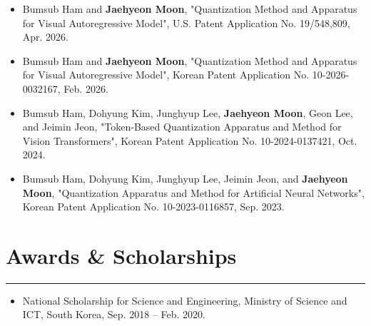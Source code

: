 \documentclass[11pt]{article}
\begin{document}
\begin{itemize}[left=0pt,itemsep=4pt,topsep=2pt]
  \item Bumsub Ham and \textbf{Jaehyeon Moon},
  "Quantization Method and Apparatus for Visual Autoregressive Model",
  U.S. Patent Application No. 19/548,809, Apr. 2026.
  \item Bumsub Ham and \textbf{Jaehyeon Moon},
  "Quantization Method and Apparatus for Visual Autoregressive Model",
  Korean Patent Application No. 10-2026-0032167, Feb. 2026.
  \item Bumsub Ham, Dohyung Kim, Junghyup Lee, \textbf{Jaehyeon Moon},
  Geon Lee, and Jeimin Jeon,
  "Token-Based Quantization Apparatus and Method for Vision Transformers",
  Korean Patent Application No. 10-2024-0137421, Oct. 2024.
  \item Bumsub Ham, Dohyung Kim, Junghyup Lee, Jeimin Jeon,
  and \textbf{Jaehyeon Moon},
  "Quantization Apparatus and Method for Artificial Neural Networks",
  Korean Patent Application No. 10-2023-0116857, Sep. 2023.
\end{itemize}

\vspace{6pt}

\section*{Awards \& Scholarships}
\hrule
\vspace{6pt}
\begin{itemize}[left=0pt,itemsep=4pt]
  \item National Scholarship for Science and Engineering, Ministry of Science and ICT, South Korea, Sep. 2018 -- Feb. 2020.
\end{itemize}


\end{document}
